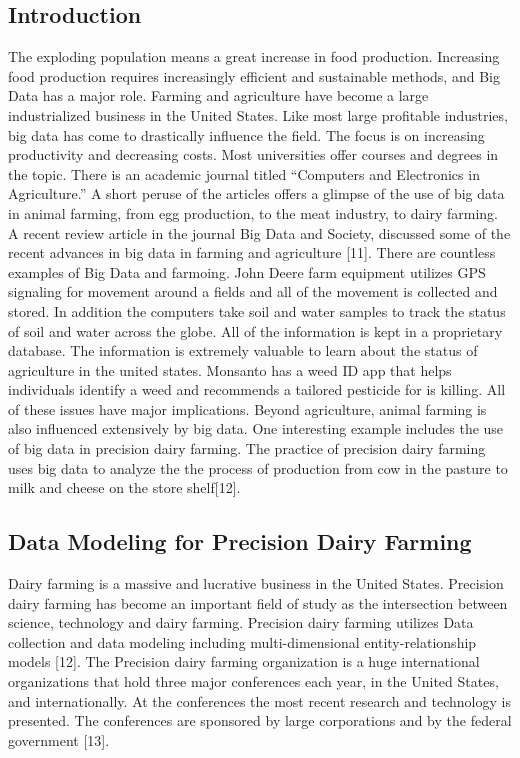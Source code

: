 \documentclass[sigconf]{acmart}
\begin{document}
\subsection{Introduction}
The exploding population means a great increase in food production. Increasing food production requires increasingly efficient and sustainable methods, and Big Data has a major role. Farming and agriculture have become a large industrialized business in the United States.  Like most large profitable industries, big data has come to drastically influence the field.  The focus is on increasing productivity and decreasing costs.  Most universities offer courses and degrees in the topic.  There is an academic journal titled “Computers and Electronics in Agriculture.”  A short peruse of the articles offers a glimpse of the use of big data in animal farming, from egg production, to the meat industry, to dairy farming. A recent review article in the  journal Big Data and Society, discussed some of the recent advances in big data in farming and agriculture [11].  There are countless examples of Big Data and farmoing.  John Deere farm equipment utilizes GPS signaling for movement around a fields and all of the movement is collected and stored.  In addition the computers take soil and water samples to track the status of soil and water across the globe.  All of the information is kept in a proprietary database.  The information is extremely valuable to learn about the status of agriculture in the united states.  Monsanto has a weed ID app that helps individuals identify a weed and recommends a tailored pesticide for is killing.  All of these issues have major implications.  Beyond agriculture, animal farming is also influenced extensively by big data.  One interesting example includes the use of big data in precision dairy farming.  The practice of precision dairy farming uses big data to analyze the the process of production from cow in the pasture to milk and cheese on the store shelf[12]. 
\subsection{Data Modeling for Precision Dairy Farming}
Dairy farming is a massive and lucrative business in the United States.  Precision dairy farming has become an important field of study as the intersection between science, technology and dairy farming. Precision dairy farming utilizes Data collection and data modeling including multi-dimensional entity-relationship models [12].   The Precision dairy farming organization is a huge international organizations that hold three major conferences each year, in the United States, and internationally.  At the conferences the most recent research and technology is presented.   The conferences are sponsored by large corporations and by the federal government [13]. 
\end{document}
